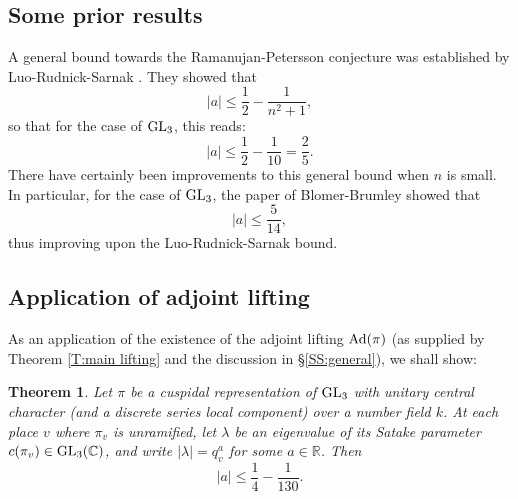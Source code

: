 \documentclass[11pt]{amsart}
\theoremstyle{plain}
\newtheorem{thm}[equation]{Theorem}
\numberwithin{equation}{section}
\newcommand{\R}{\mathbb R}
\newcommand{\C}{\mathbb C}
\def\GL{{\rm GL}}
\def\R{{\mathbb R}}
\def\C{{\bf C}}
\def\C{{\mathbb C}}
\begin{document}
\vskip 5pt

\subsection{\bf Some prior results}
A general bound towards the Ramanujan-Petersson conjecture  was established by Luo-Rudnick-Sarnak \cite{LRS}. They showed that
\[  |a| \leq \frac{1}{2}  - \frac{1}{n^2+1}, \]
so that for the case of $\GL_3$, this reads:
\[  |a| \leq \frac{1}{2} - \frac{1}{10} = \frac{2}{5}. \]
There have certainly been improvements to this general bound when $n$ is small. In particular, for the case of $\GL_3$, the paper \cite{BB} of Blomer-Brumley showed that 
\[  |a| \leq  \frac{5}{14}, \]
thus improving upon the Luo-Rudnick-Sarnak bound. 
\vskip 5pt

\subsection{\bf Application of adjoint lifting}
As an application of  the existence of the adjoint lifting ${\rm Ad}(\pi)$ (as supplied by Theorem \ref{T:main lifting} and the discussion in \S \ref{SS:general}), we shall show:
\vskip 5pt

\begin{thm} \label{T:Rama2}
Let $\pi$ be a cuspidal representation of $\GL_3$ with unitary central character (and a discrete series local component) over a number field $k$. At each place $v$ where $\pi_v$ is unramified, let $\lambda$ be an eigenvalue of its Satake parameter $c(\pi_v) \in \GL_3(\C)$, and write $|\lambda| = q_v^a$ for some $a \in \R$. Then
\[  |a| \leq \frac{1}{4} - \frac{1}{130}. \] 
\end{thm}
\vskip 5pt
\end{document}
